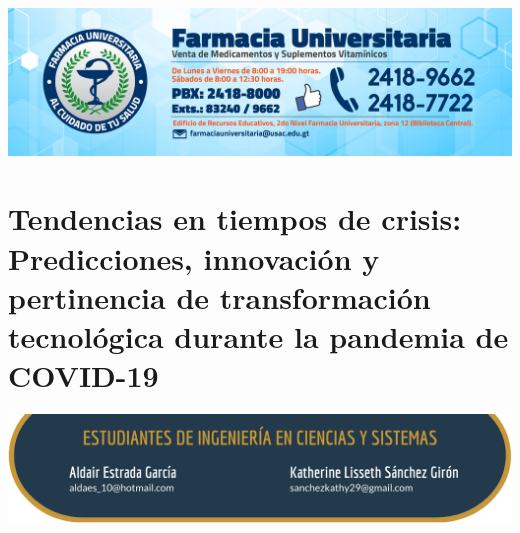 \documentclass[12pt,spanish,Letterpaper,openany]{book}
\begin{document}
\begin{center}\includegraphics[width=1\linewidth]{images/publicidad5} \end{center}

\hypertarget{pareja24}{%
\chapter{Tendencias en tiempos de crisis: Predicciones, innovación y pertinencia de transformación tecnológica durante la pandemia de COVID-19}\label{pareja24}}

\begin{center}\includegraphics[width=1\linewidth]{images/pareja24_image1} \end{center}
\end{document}
